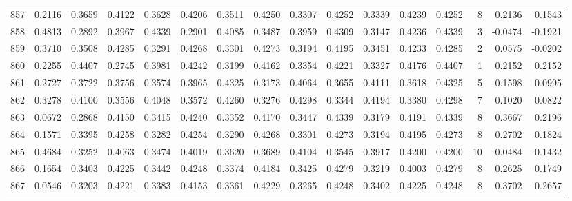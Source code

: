 \begin{tabular}{lrrrrrrrrrrrrrrr}
857 &      0.2116 &  0.3659 &  0.4122 &  0.3628 &  0.4206 &  0.3511 &  0.4250 &  0.3307 &  0.4252 &  0.3339 &   0.4239 &     0.4252 &      8 &                    0.2136 &                     0.1543 \\
858 &      0.4813 &  0.2892 &  0.3967 &  0.4339 &  0.2901 &  0.4085 &  0.3487 &  0.3959 &  0.4309 &  0.3147 &   0.4236 &     0.4339 &      3 &                   -0.0474 &                    -0.1921 \\
859 &      0.3710 &  0.3508 &  0.4285 &  0.3291 &  0.4268 &  0.3301 &  0.4273 &  0.3194 &  0.4195 &  0.3451 &   0.4233 &     0.4285 &      2 &                    0.0575 &                    -0.0202 \\
860 &      0.2255 &  0.4407 &  0.2745 &  0.3981 &  0.4242 &  0.3199 &  0.4162 &  0.3354 &  0.4221 &  0.3327 &   0.4176 &     0.4407 &      1 &                    0.2152 &                     0.2152 \\
861 &      0.2727 &  0.3722 &  0.3756 &  0.3574 &  0.3965 &  0.4325 &  0.3173 &  0.4064 &  0.3655 &  0.4111 &   0.3618 &     0.4325 &      5 &                    0.1598 &                     0.0995 \\
862 &      0.3278 &  0.4100 &  0.3556 &  0.4048 &  0.3572 &  0.4260 &  0.3276 &  0.4298 &  0.3344 &  0.4194 &   0.3380 &     0.4298 &      7 &                    0.1020 &                     0.0822 \\
863 &      0.0672 &  0.2868 &  0.4150 &  0.3415 &  0.4240 &  0.3352 &  0.4170 &  0.3447 &  0.4339 &  0.3179 &   0.4191 &     0.4339 &      8 &                    0.3667 &                     0.2196 \\
864 &      0.1571 &  0.3395 &  0.4258 &  0.3282 &  0.4254 &  0.3290 &  0.4268 &  0.3301 &  0.4273 &  0.3194 &   0.4195 &     0.4273 &      8 &                    0.2702 &                     0.1824 \\
865 &      0.4684 &  0.3252 &  0.4063 &  0.3474 &  0.4019 &  0.3620 &  0.3689 &  0.4104 &  0.3545 &  0.3917 &   0.4200 &     0.4200 &     10 &                   -0.0484 &                    -0.1432 \\
866 &      0.1654 &  0.3403 &  0.4225 &  0.3442 &  0.4248 &  0.3374 &  0.4184 &  0.3425 &  0.4279 &  0.3219 &   0.4003 &     0.4279 &      8 &                    0.2625 &                     0.1749 \\
867 &      0.0546 &  0.3203 &  0.4221 &  0.3383 &  0.4153 &  0.3361 &  0.4229 &  0.3265 &  0.4248 &  0.3402 &   0.4225 &     0.4248 &      8 &                    0.3702 &                     0.2657 \\

\end{tabular}
